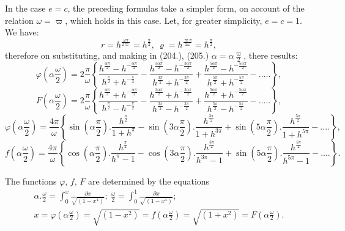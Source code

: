 \documentclass{article}
\begin{document}
In the case $e=c$, the preceding formulas take a simpler form, on account of the relation $\omega=\varpi$, which holds in this case. Let, for greater simplicity, $e=c=1$. We have:
\[
r = h^{\frac{\omega\pi}{2\varpi}} = h^{\frac{\pi}{2}},\ \varrho = h^{\frac{\varpi\pi}{2\omega}} = h^{\frac{\pi}{2}},
\]
therefore on substituting, and making in (204.), (205.) $\alpha=\alpha\frac{\varpi}{2}$, there results:
\[
\varphi\left(\alpha\frac{\omega}{2}\right) = 2\frac{\pi}{\omega}\left\{\frac{h^{\frac{\alpha\pi}{2}}-h^{-\frac{\alpha\pi}{2}}}{h^{\frac{\pi}{2}}+h^{-\frac{\pi}{2}}}-\frac{h^{\frac{3\alpha\pi}{2}}-h^{-\frac{3\alpha\pi}{2}}}{h^{\frac{3\pi}{2}}+h^{-\frac{3\pi}{2}}}+\frac{h^{\frac{5\alpha\pi}{2}}-h^{-\frac{5\alpha\pi}{2}}}{h^{\frac{5\pi}{2}}+h^{-\frac{5\pi}{2}}}-.....\right\},
\]
\[
F\left(\alpha\frac{\omega}{2}\right) = 2\frac{\pi}{\omega}\left\{\frac{h^{\frac{\alpha\pi}{2}}+h^{-\frac{\alpha\pi}{2}}}{h^{\frac{\pi}{2}}-h^{-\frac{\pi}{2}}}-\frac{h^{\frac{3\alpha\pi}{2}}+h^{-\frac{3\alpha\pi}{2}}}{h^{\frac{3\pi}{2}}-h^{-\frac{3\pi}{2}}}+\frac{h^{\frac{5\alpha\pi}{2}}+h^{-\frac{5\alpha\pi}{2}}}{h^{\frac{5\pi}{2}}-h^{-\frac{5\pi}{2}}}-.....\right\},
\]
\[
\varphi\left(\alpha\frac{\omega}{2}\right) = \frac{4\pi}{\omega}\left\{\sin\left(\alpha\frac{\pi}{2}\right).\frac{h^{\frac{\pi}{2}}}{1+h^{\pi}}-\sin\left(3\alpha\frac{\pi}{2}\right).\frac{h^{\frac{3\pi}{2}}}{1+h^{3\pi}}+\sin\left(5\alpha\frac{\pi}{2}\right).\frac{h^{\frac{5\pi}{2}}}{1+h^{5\pi}}-....\right\},
\]
\[
f\left(\alpha\frac{\omega}{2}\right) = \frac{4\pi}{\omega}\left\{\cos\left(\alpha\frac{\pi}{2}\right).\frac{h^{\frac{\pi}{2}}}{h^{\pi}-1}-\cos\left(3\alpha\frac{\pi}{2}\right).\frac{h^{\frac{3\pi}{2}}}{h^{3\pi}-1}+\sin\left(5\alpha\frac{\pi}{2}\right).\frac{h^{\frac{5\pi}{2}}}{h^{5\pi}-1}-....\right\}.
\]

The functions $\varphi$, $f$, $F$ are determined by the equations
\[
\begin{gathered}
\alpha.\frac{\omega}{2} = \int_{0}^{x}\frac{\partial x}{\sqrt{(1-x^{4})}};\ \frac{\omega}{2} = \int_{0}^{1}\frac{\partial x}{\sqrt{(1-x^{4})}};\\
x = \varphi\left(\alpha\frac{\omega}{2}\right) = \sqrt{(1-x^{2})} = f\left(\alpha\frac{\omega}{2}\right) = \sqrt{(1+x^{2})} = F\left(\alpha\frac{\omega}{2}\right).
\end{gathered}
\]
\end{document}
